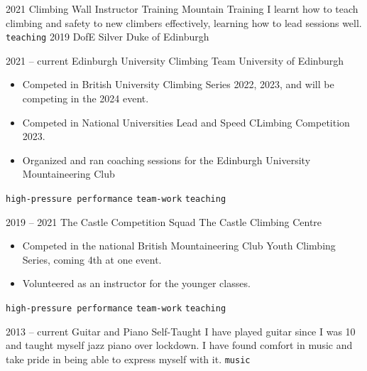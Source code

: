 \documentclass[9pt]{developercv} %
\begin{document}
\vspace{-10 pt}
\begin{entrylist}
	\entry
        {2021}
		{Climbing Wall Instructor Training}
		{Mountain Training}
		{ 
			I learnt how to teach climbing and safety to new climbers effectively, learning how to lead sessions well. 
			\newline
        	\texttt{teaching}
		}
	\entry
        {2019}
		{DofE Silver}
		{Duke of Edinburgh}
		{ 
		}
\end{entrylist}


\vspace{-10 pt}
\begin{entrylist}
	\entry
        {2021 -- current}
		{Edinburgh University Climbing Team}
		{University of Edinburgh}
		{\vspace{-10pt}
        \begin{itemize}[noitemsep,topsep=0pt,parsep=0pt,partopsep=0pt, leftmargin=-1pt]
            \item Competed in British University Climbing Series 2022, 2023, and will be competing in the 2024 event. 
            \item Competed in National Universities Lead and Speed CLimbing Competition 2023. 
            \item Organized and ran coaching sessions for the Edinburgh University Mountaineering Club
        \end{itemize} 
        \texttt{high-pressure performance} \slashsep \texttt{team-work} \slashsep \texttt{teaching}}
	\entry
		{2019 -- 2021}
		{The Castle Competition Squad}
		{The Castle Climbing Centre}
		{\vspace{-10pt}
        \begin{itemize}[noitemsep,topsep=0pt,parsep=0pt,partopsep=0pt, leftmargin=-1pt]
            \item Competed in the national British Mountaineering Club Youth Climbing Series, coming 4th at one event.
            \item Volunteered as an instructor for the younger classes. 
        \end{itemize} 
        \texttt{high-pressure performance} \slashsep \texttt{team-work} \slashsep \texttt{teaching}}
	\entry
		{2013 -- current}
		{Guitar and Piano}
		{Self-Taught}
		{
			I have played guitar since I was 10 and taught myself jazz piano over lockdown. 
			I have found comfort in music and take pride in being able to express myself with it. 
        \newline
		\texttt{music}
		}
\end{entrylist}
\end{document}
